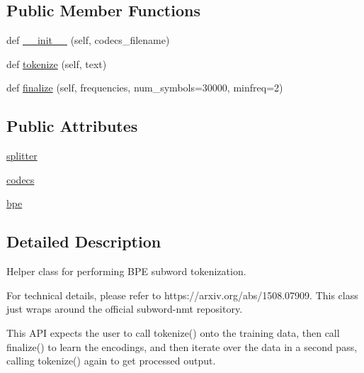 \subsection*{Public Member Functions}
\begin{DoxyCompactItemize}
\item 
def \hyperlink{classparlai_1_1agents_1_1legacy__agents_1_1seq2seq_1_1dict__v0_1_1__BPEHelper_aef7e3f8a0917447dc3c30fba14803466}{\+\_\+\+\_\+init\+\_\+\+\_\+} (self, codecs\+\_\+filename)
\item 
def \hyperlink{classparlai_1_1agents_1_1legacy__agents_1_1seq2seq_1_1dict__v0_1_1__BPEHelper_a33d5217e263257279fe081b02da95d8d}{tokenize} (self, text)
\item 
def \hyperlink{classparlai_1_1agents_1_1legacy__agents_1_1seq2seq_1_1dict__v0_1_1__BPEHelper_a9a5b899a899872f36079d4a7b9dc8ae4}{finalize} (self, frequencies, num\+\_\+symbols=30000, minfreq=2)
\end{DoxyCompactItemize}
\subsection*{Public Attributes}
\begin{DoxyCompactItemize}
\item 
\hyperlink{classparlai_1_1agents_1_1legacy__agents_1_1seq2seq_1_1dict__v0_1_1__BPEHelper_aa887d94516544a4b161e9d36eb9070f5}{splitter}
\item 
\hyperlink{classparlai_1_1agents_1_1legacy__agents_1_1seq2seq_1_1dict__v0_1_1__BPEHelper_ad9b4ceef51b057f4d8640b0634ee061e}{codecs}
\item 
\hyperlink{classparlai_1_1agents_1_1legacy__agents_1_1seq2seq_1_1dict__v0_1_1__BPEHelper_a101cb6e959d4ff3d9133743d6d282110}{bpe}
\end{DoxyCompactItemize}


\subsection{Detailed Description}
\begin{DoxyVerb}Helper class for performing BPE subword tokenization.

For technical details, please refer to https://arxiv.org/abs/1508.07909.
This class just wraps around the official subword-nmt repository.

This API expects the user to call tokenize() onto the training data,
then call finalize() to learn the encodings, and then iterate over the data
in a second pass, calling tokenize() again to get processed output.
\end{DoxyVerb}
 

